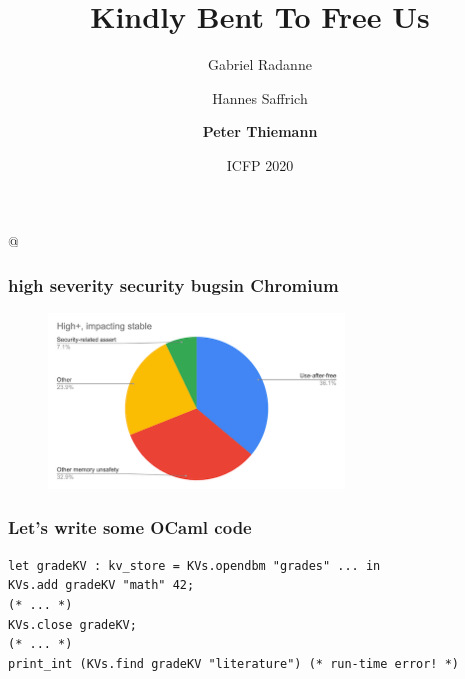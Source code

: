 \documentclass[aspectratio=169,dvipsnames,svgnames,10pt]{beamer}
\title{Kindly Bent To Free Us}
\author{{Gabriel {Radanne}}
  \and Hannes {Saffrich}
  \and \textbf{Peter {Thiemann}}}
\date{ICFP 2020}
\begin{document}
\lstMakeShortInline[keepspaces,basicstyle=\small\ttfamily]@

\frame[plain]{\titlepage}


\begin{frame}
  \frametitle{\og high severity security bugs\fg in Chromium}

  \begin{figure}[h]
    \centering
    \includegraphics[width=0.7\textwidth]
    {chromium-use-after-free}
  \end{figure}

  
\end{frame}

\begin{frame}[fragile]
  \frametitle{Let's write some OCaml code}

\begin{verbatim}
let gradeKV : kv_store = KVs.opendbm "grades" ... in
KVs.add gradeKV "math" 42;
(* ... *)
KVs.close gradeKV;
(* ... *)
print_int (KVs.find gradeKV "literature") (* run-time error! *)
\end{verbatim}
  
\end{frame}
\end{document}

